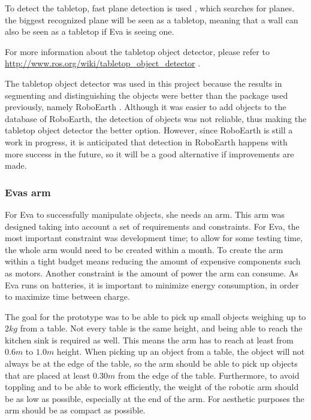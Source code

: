 \documentclass[project_eva.tex]{subfiles}
\begin{document}
To detect the tabletop, fast plane detection is used \cite{plane}, which 
searches for planes. the biggest recognized plane will be seen as a tabletop, meaning that a wall can also be seen as a 
tabletop if Eva is seeing one.

For more information about the tabletop object detector, please refer to \url{http://www.ros.org/wiki/tabletop\_object\_detector} \cite{tabletop}.

The tabletop object detector was used in this project because the results in segmenting and distinguishing the objects were 
better than the package used previously, namely RoboEarth \cite{Roboearth}. Although it was easier to add objects to the 
database of RoboEarth, the detection of objects was not reliable, thus making the tabletop object detector the better 
option. However, since RoboEarth is still a work in progress, it is anticipated that detection in RoboEarth happens with 
more success in the future, so it will be a good alternative if improvements are made.

\subsubsection*{Eva\textquotesingle s arm}
For Eva to successfully manipulate objects, she needs an arm. This arm was designed taking into account a set of requirements and constraints. For Eva, the most important constraint was development time; to allow for some testing time, the whole arm would need to be created within a month. To create the arm within a tight budget means reducing the amount of expensive components such as motors. Another constraint is the amount of power the arm can consume. As Eva runs on batteries, it is important to minimize energy consumption, in order to maximize time between charge.

 The goal for the prototype was to be able to pick up small objects weighing up to $2kg$ from a table. Not every table is the same height, and being able to reach the kitchen sink is required as well. This means the arm has to reach at least from $0.6m$ to $1.0m$ height. %
When picking up an object from a table, the object will not always be at the edge of the table, so the arm should be able to pick up objects that are placed at least $0.30m$ from the edge of the table. %
Furthermore, to avoid toppling and to be able to work efficiently, the weight of the robotic arm should be as low as possible, especially at the end of the arm. For aesthetic purposes the arm should be as compact as possible.
\end{document}

